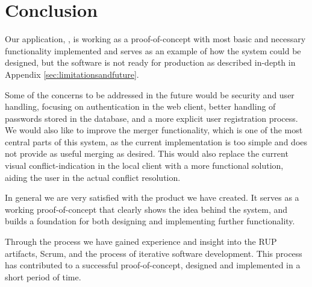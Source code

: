 \section{Conclusion}
Our application, \SOP{}, is working as a proof-of-concept with most basic and necessary functionality implemented and serves as an example of how the system could be designed, but the software is not ready for production as described in-depth in Appendix \ref{sec:limitationsandfuture}.

Some of the concerns to be addressed in the future would be security and user handling, focusing on authentication in the web client, better handling of passwords stored in the database, and a more explicit user registration process. We would also like to improve the merger functionality, which is one of the most central parts of this system, as the current implementation is too simple and does not provide as useful merging as desired. This would also replace the current visual conflict-indication in the local client with a more functional solution, aiding the user in the actual conflict resolution.

In general we are very satisfied with the product we have created. It serves as a working proof-of-concept that clearly shows the idea behind the \SOP{} system, and builds a foundation for both designing and implementing further functionality. 

Through the process we have gained experience and insight into the RUP artifacts, Scrum, and the process of iterative software development. This process has contributed to a successful proof-of-concept, designed and implemented in a short period of time.
